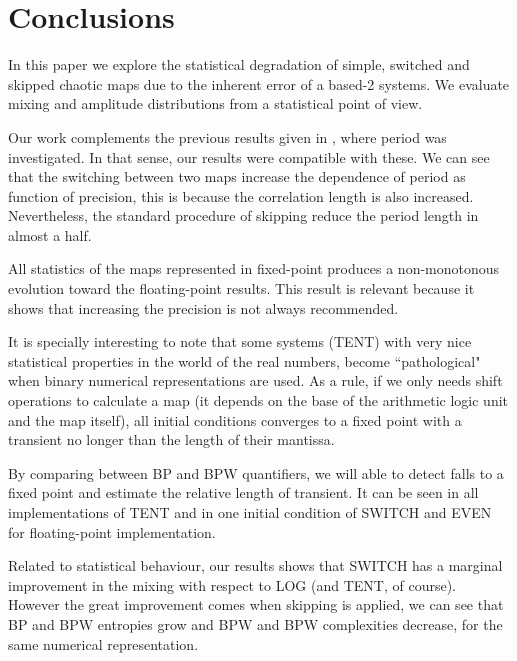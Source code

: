 \section{Conclusions}\label{sec:conclusions}
In this paper we explore the statistical degradation of simple, switched and skipped chaotic maps due to the inherent error of a based-2 systems.
We evaluate mixing and amplitude distributions from a statistical point of view.

Our work complements the previous results given in \cite{Nagaraj2008}, where period was investigated.
In that sense, our results were compatible with these.
We can see that the switching between two maps increase the dependence of period as function of precision, this is because the correlation length is also increased.
Nevertheless, the standard procedure of skipping reduce the period length in almost a half.

All statistics of the maps represented in fixed-point produces a non-monotonous evolution toward the floating-point results.
This result is relevant because it shows that increasing the precision is not always recommended.

It is specially interesting to note that some systems (TENT) with very nice statistical properties in the world of the real numbers, become ``pathological" when binary numerical representations are used.
As a rule, if we only needs shift operations to calculate a map (it depends on the base of the arithmetic logic unit and the map itself), all initial conditions converges to a fixed point with a transient no longer than the length of their mantissa.

By comparing between BP and BPW quantifiers, we will able to detect falls to a fixed point and estimate the relative length of transient. It can be seen in all implementations of TENT and in one initial condition of SWITCH and EVEN for floating-point implementation.

Related to statistical behaviour, our results shows that SWITCH has a marginal improvement in the mixing with respect to LOG (and TENT, of course).
However the great improvement comes when skipping is applied, we can see that BP and BPW entropies grow and BPW and BPW complexities decrease, for the same numerical representation.
